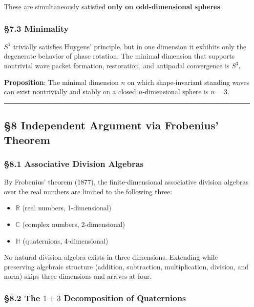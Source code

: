 \documentclass[
  a4paper,11pt]{article}
\providecommand{\tightlist}{%
  \setlength{\itemsep}{0pt}\setlength{\parskip}{0pt}}
\theoremstyle{definition}
\theoremstyle{remark}
\begin{document}
These are simultaneously satisfied \textbf{only on odd-dimensional
spheres}.

\subsubsection{§7.3 Minimality}\label{minimality}

\(S^1\) trivially satisfies Huygens' principle, but in one dimension it
exhibits only the degenerate behavior of phase rotation. The minimal
dimension that supports nontrivial wave packet formation, restoration,
and antipodal convergence is \textbf{\(S^3\)}.

\textbf{Proposition}: The minimal dimension \(n\) on which
shape-invariant standing waves can exist nontrivially and stably on a
closed \(n\)-dimensional sphere is \(n = 3\).

\begin{center}\rule{0.5\linewidth}{0.5pt}\end{center}

\subsection{§8 Independent Argument via Frobenius'
Theorem}\label{independent-argument-via-frobenius-theorem}

\subsubsection{§8.1 Associative Division
Algebras}\label{associative-division-algebras}

By Frobenius' theorem (1877), the finite-dimensional associative
division algebras over the real numbers are limited to the following
three:

\begin{itemize}
\tightlist
\item
  \(\mathbb{R}\) (real numbers, 1-dimensional)
\item
  \(\mathbb{C}\) (complex numbers, 2-dimensional)
\item
  \(\mathbb{H}\) (quaternions, 4-dimensional)
\end{itemize}

No natural division algebra exists in three dimensions. Extending while
preserving algebraic structure (addition, subtraction, multiplication,
division, and norm) skips three dimensions and arrives at four.

\subsubsection{\texorpdfstring{§8.2 The \(1+3\) Decomposition of
Quaternions}{§8.2 The 1+3 Decomposition of Quaternions}}\label{the-13-decomposition-of-quaternions}
\end{document}
